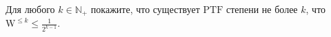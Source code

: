 Для любого $k \in \mathbb{N}_{+}$ покажите, что существует $\mathrm{PTF}$ степени не более $k$, что
$\mathrm{W}^{\le k} \le \frac{1}{2^{k - 1}}$.